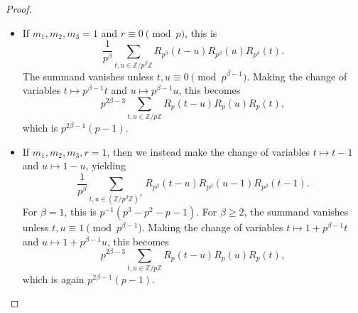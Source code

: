 \documentclass[10pt,a4paper]{amsart}
\newcommand{\Z}{\mathbb{Z}}
\begin{document}
\begin{proof}
\begin{itemize}[leftmargin=*]
\item If $m_1, m_2, m_3 = 1$ and $r \equiv 0 \pmod{p}$, this is
\[\frac{1}{p^{\beta}} \sum_{t,u \in \Z/p^{\beta}\Z} R_{p^{\beta}}(t - u) R_{p^{\beta}}(u) R_{p^{\beta}}(t).\]
The summand vanishes unless $t,u \equiv 0 \pmod{p^{\beta - 1}}$. Making the change of variables $t \mapsto p^{\beta - 1}t$ and $u \mapsto p^{\beta - 1}u$, this becomes
\[p^{2\beta - 3} \sum_{t,u \in \Z/p\Z} R_p(t - u) R_p(u) R_p(t),\]
which is $p^{2\beta - 1} (p - 1)$.
\item If $m_1, m_2, m_3, r = 1$, then we instead make the change of variables $t \mapsto t - 1$ and $u \mapsto 1 - u$, yielding
\[\frac{1}{p^{\beta}} \sum_{t,u \in (\Z/p^{\beta}\Z)^{\times}} R_{p^{\beta}}(t - u) R_{p^{\beta}}(u - 1) R_{p^{\beta}}(t - 1).\]
For $\beta = 1$, this is $p^{-1} (p^3 - p^2 - p - 1)$. For $\beta \geq 2$, the summand vanishes unless $t,u \equiv 1 \pmod{p^{\beta - 1}}$. Making the change of variables $t \mapsto 1 + p^{\beta - 1}t$ and $u \mapsto 1 + p^{\beta - 1}u$, this becomes
\[p^{2\beta - 3} \sum_{t,u \in \Z/p\Z} R_p(t - u) R_p(u) R_p(t),\]
which is again $p^{2\beta - 1} (p - 1)$.\qedhere
\end{itemize}
\end{proof}
\end{document}
